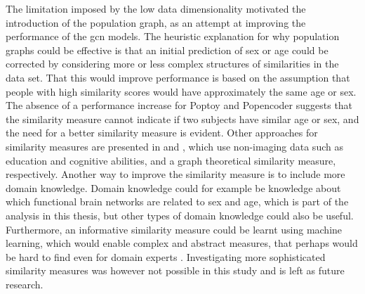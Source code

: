 The limitation imposed by the low data dimensionality motivated the introduction of the population graph, as an attempt at improving the performance of the \acrshort{gcn} models. The heuristic explanation for why population graphs could be effective is that an initial prediction of sex or age could be corrected by considering more or less complex structures of similarities in the data set. That this would improve performance is based on the assumption that people with high similarity scores would have approximately the same age or sex. The absence of a performance increase for Poptoy and Popencoder suggests that the similarity measure cannot indicate if two subjects have similar age or sex, and the need for a better similarity measure is evident. Other approaches for similarity measures are presented in \cite{stankeviciute} and \cite{higcn}, which use non-imaging data such as education and cognitive abilities, and a graph theoretical similarity measure, respectively. Another way to improve the similarity measure is to include more domain knowledge. Domain knowledge could for example be knowledge about which functional brain networks are related to sex and age, which is part of the analysis in this thesis, but other types of domain knowledge could also be useful. Furthermore, an informative similarity measure could be learnt using machine learning, which would enable complex and abstract measures, that perhaps would be hard to find even for domain experts \cite{sim_meas_constr}. Investigating more sophisticated similarity measures was however not possible in this study and is left as future research. 




